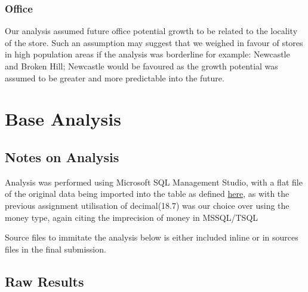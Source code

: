 \documentclass{article}
\begin{document}
            \subsubsection{Office}
                Our analysis assumed future office potential growth to be 
                related to the locality of the store. Such an assumption
                may suggest that we weighed in favour of stores in 
                high population areas if the analysis was borderline
                for example: Newcastle and Broken Hill; Newcastle
                would be favoured as the growth potential was assumed to 
                be greater and more predictable into the future.

            \newpage

    \section{Base Analysis}
    \label{sec:BA}

        \subsection{Notes on Analysis}
            Analysis was performed using Microsoft SQL Management Studio,
            with a flat file of the original data being imported into 
            the table as defined \hyperref[sec:ETL]{\color{blue}here},
            as with the previous assignment utilisation of decimal(18.7) was our choice over using the money type, again citing
            the imprecision of money in MSSQL/TSQL\cite{MoneyIssues}

            Source files to immitate the analysis below is either included inline or in sources files in the final submission.

            \subsection{Raw Results}
\end{document}
